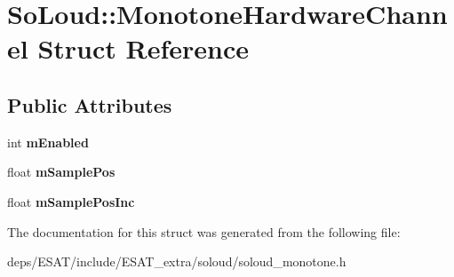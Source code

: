 \hypertarget{struct_so_loud_1_1_monotone_hardware_channel}{}\section{So\+Loud\+:\+:Monotone\+Hardware\+Channel Struct Reference}
\label{struct_so_loud_1_1_monotone_hardware_channel}
\subsection*{Public Attributes}
\begin{DoxyCompactItemize}
\item 
\mbox{\label{struct_so_loud_1_1_monotone_hardware_channel_ac9b01626e2c41c0514b5dd5b31e638b3}} 
int {\bfseries m\+Enabled}
\item 
\mbox{\label{struct_so_loud_1_1_monotone_hardware_channel_ab174cd3122d83fcd84b4a59f83f1839b}} 
float {\bfseries m\+Sample\+Pos}
\item 
\mbox{\label{struct_so_loud_1_1_monotone_hardware_channel_a48d914147bfcc40f7060903fe3060540}} 
float {\bfseries m\+Sample\+Pos\+Inc}
\end{DoxyCompactItemize}


The documentation for this struct was generated from the following file\+:\begin{DoxyCompactItemize}
\item 
deps/\+E\+S\+A\+T/include/\+E\+S\+A\+T\+\_\+extra/soloud/soloud\+\_\+monotone.\+h\end{DoxyCompactItemize}
